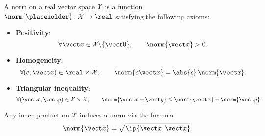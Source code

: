 \begin{definition}
A norm on a real vector space $\mathcal X$ is a function $\norm{\placeholder}: \mathcal X \to \real$ satisfying the following axioms:
\begin{itemize}
    \item
        \textbf{Positivity}:
        \[
            \forall \vect x \in \mathcal X \backslash \{\vect 0\}, \qquad
            \norm{\vect x} > 0.
        \]

    \item
        \textbf{Homogeneity}:
        \[
            \forall (c, \vect x) \in \real \times \mathcal X, \qquad
            \norm{c \vect x} = \abs{c} \, \norm{\vect x} .
        \]

    \item
        \textbf{Triangular inequality}:
        \[
            \forall (\vect x, \vect y) \in \mathcal X \times \mathcal X, \qquad
            \norm{\vect x + \vect y} \leq \norm{\vect x} + \norm{\vect y}.
        \]
\end{itemize}
\end{definition}
Any inner product on $\mathcal X$ induces a norm via the formula
\[
    \norm{\vect x} = \sqrt{\ip{\vect x, \vect x}}.
\]

